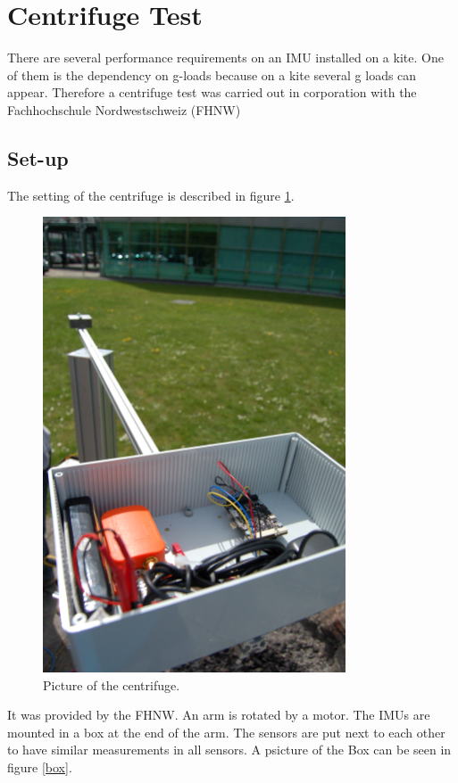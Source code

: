 \section{Centrifuge Test}
There are several performance requirements on an IMU installed on a kite. One of them is the dependency on g-loads because on a kite several g loads can appear. Therefore a centrifuge test was carried out in corporation with the Fachhochschule Nordwestschweiz (FHNW)
\subsection{Set-up}
The setting of the centrifuge is described in figure \ref{centrifuge}.
\begin{figure}[hb]
\begin{center}
\includegraphics[width=0.8\textwidth]{pictures/centrifuge.JPG}
\caption{Picture of the centrifuge.}
\label{centrifuge}
\end{center}
\end{figure}
It was provided by the FHNW. An arm is rotated by a motor. The IMUs are mounted in a box at the end of the arm. The sensors are put next to each other to have similar measurements in all sensors. A psicture of the Box can be seen in figure \ref{box}. 
